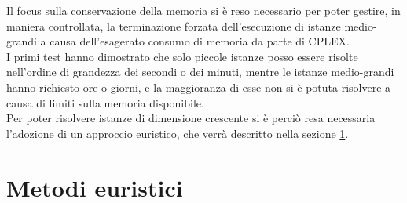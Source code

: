 Il focus sulla conservazione della memoria si è reso necessario per poter gestire, in maniera controllata, la terminazione forzata dell'esecuzione di istanze medio-grandi a causa dell'esagerato consumo di memoria da parte di CPLEX. \\
I primi test hanno dimostrato che solo piccole istanze posso essere risolte nell'ordine di grandezza dei secondi o dei minuti, mentre le istanze medio-grandi hanno richiesto ore o giorni, e la maggioranza di esse non si è potuta risolvere a causa di limiti sulla memoria disponibile. \\
Per poter risolvere istanze di dimensione crescente si è perciò resa necessaria l'adozione di un approccio euristico, che verrà descritto nella sezione \ref{sec:euristica}.

\section{Metodi euristici} \label{sec:euristica}

